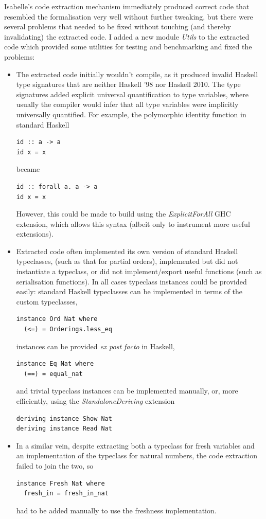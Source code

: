 Isabelle's code extraction mechanism immediately produced correct code that resembled the formalisation very well without further tweaking, but there were several problems that needed to be fixed without touching (and thereby invalidating) the extracted code.
I added a new module \emph{Utils} to the extracted code which provided some utilities for testing and benchmarking and fixed the problems:
\begin{itemize}
\item
The extracted code initially wouldn't compile, as it produced invalid Haskell type signatures that are neither Haskell '98 nor Haskell 2010.
The type signatures added explicit universal quantification to type variables, where usually the compiler would infer that all type variables were implicitly universally quantified.
For example, the polymorphic identity function in standard Haskell
\begin{verbatim}
id :: a -> a
id x = x
\end{verbatim}
became
\begin{verbatim}
id :: forall a. a -> a
id x = x
\end{verbatim}
However, this could be made to build using the \emph{ExplicitForAll} GHC extension, which allows this syntax (albeit only to instrument more useful extensions).
\item
Extracted code often implemented its own version of standard Haskell typeclasses, (such as that for partial orders), implemented but did not instantiate a typeclass, or did not implement/export useful functions (such as serialisation functions).
In all cases typeclass instances could be provided easily:
standard Haskell typeclasses can be implemented in terms of the custom typeclasses,
\begin{verbatim}
instance Ord Nat where
  (<=) = Orderings.less_eq
\end{verbatim}
instances can be provided \emph{ex post facto} in Haskell,
\begin{verbatim}
instance Eq Nat where
  (==) = equal_nat
\end{verbatim}
and trivial typeclass instances can be implemented manually, or, more efficiently, using the \emph{StandaloneDeriving} extension
\begin{verbatim}
deriving instance Show Nat
deriving instance Read Nat
\end{verbatim}
\item
In a similar vein, despite extracting both a typeclass for fresh variables and an implementation of the typeclass for natural numbers, the code extraction failed to join the two, so
\begin{verbatim}
instance Fresh Nat where
  fresh_in = fresh_in_nat
\end{verbatim}
had to be added manually to use the freshness implementation.
\end{itemize}
